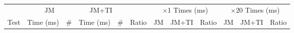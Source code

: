 %
%

\begin{figure*}[ht]
\centering
\begin{tabular}{lrrrrrrrrrrr}

\toprule

           & \multicolumn{2}{c}{JM}
           & \multicolumn{2}{c}{JM+TI}
           & %
           & \multicolumn{3}{c}{$\times$1 Times (ms)}
           & \multicolumn{3}{c}{$\times$20 Times (ms)} \\

\cmidrule(r){2-3}
\cmidrule{4-5}
\cmidrule(r){7-9}
\cmidrule{10-12}

Test       & Time (ms) & \#
           & Time (ms) & \#
           & Ratio
           & JM
           & JM+TI
           & Ratio
           & JM
           & JM+TI
           & Ratio \\

\midrule


\end{tabular}
\end{figure*}
